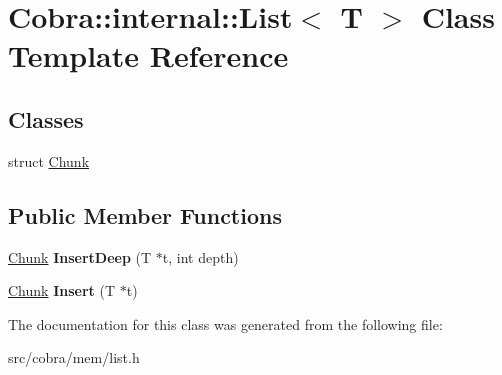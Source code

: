 \hypertarget{class_cobra_1_1internal_1_1_list}{\section{Cobra\+:\+:internal\+:\+:List$<$ T $>$ Class Template Reference}
\label{class_cobra_1_1internal_1_1_list}
}
\subsection*{Classes}
\begin{DoxyCompactItemize}
\item 
struct \hyperlink{struct_cobra_1_1internal_1_1_list_1_1_chunk}{Chunk}
\end{DoxyCompactItemize}
\subsection*{Public Member Functions}
\begin{DoxyCompactItemize}
\item 
\hypertarget{class_cobra_1_1internal_1_1_list_acddbd5bcc68aa8b966675eeff63ee415}{\hyperlink{struct_cobra_1_1internal_1_1_list_1_1_chunk}{Chunk} {\bfseries Insert\+Deep} (T $\ast$t, int depth)}\label{class_cobra_1_1internal_1_1_list_acddbd5bcc68aa8b966675eeff63ee415}

\item 
\hypertarget{class_cobra_1_1internal_1_1_list_a8594f0fda24808bbac9409993c7d7880}{\hyperlink{struct_cobra_1_1internal_1_1_list_1_1_chunk}{Chunk} {\bfseries Insert} (T $\ast$t)}\label{class_cobra_1_1internal_1_1_list_a8594f0fda24808bbac9409993c7d7880}

\end{DoxyCompactItemize}


The documentation for this class was generated from the following file\+:\begin{DoxyCompactItemize}
\item 
src/cobra/mem/list.\+h\end{DoxyCompactItemize}

